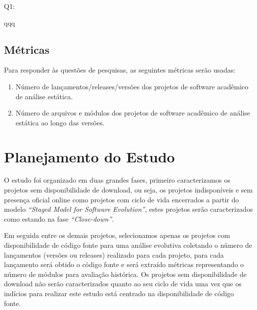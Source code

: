 \begin{description}
  \item Q1: \EstudoTresQuestaoUm

  \item qqq
\end{description}


\subsection{Métricas}

Para responder às questões de pesquisas, as seguintes métricas serão usadas:

\begin{enumerate}
  \item Número de lançamentos/releases/versões dos projetos de software acadêmico de análise estática.
  \item Número de arquivos e módulos dos projetos de software acadêmico de análise estática ao longo das versões.
\end{enumerate}


\section{Planejamento do Estudo} \label{estudo3:planejamento}

O estudo foi organizado em duas grandes fases, primeiro caracterizamos os
projetos sem disponibilidade de download, ou seja, os projetos indisponíveis e
sem presença oficial online como projetos com ciclo de vida encerrados a partir
do modelo {\it ``Staged Model for Software Evolution''}, estes projetos serão
caracterizados como estando na fase {\it ``Close-down''}.

Em seguida entre os demais projetos, selecionamos apenas os projetos com
disponibilidade de código fonte para uma análise evolutiva coletando o número
de lançamentos (versões ou releases) realizado para cada projeto, para cada
lançamento será obtido o código fonte e será extraído métricas representando o
número de módulos para avaliação histórica. Os projetos sem disponibilidade de
download não serão caracterizados quanto ao seu ciclo de vida uma vez que os
indícios para realizar este estudo está centrado na disponibilidade de código
fonte.

